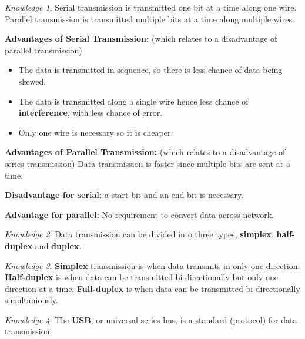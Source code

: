 \documentclass[8pt]{article}
\theoremstyle{remark}
\newtheorem{knowledge}{Knowledge}[subsection]
\begin{document}
        \begin{knowledge}
            Serial transmission is transmitted one bit at a time along one wire. Parallel transmission is transmitted multiple bits at a time along multiple wires.

            \textbf{Advantages of Serial Transmission:} (which relates to a disadvantage of parallel transmission)
            \begin{itemize}
                \item The data is transmitted in sequence, so there is less chance of data being skewed.
                \item The data is transmitted along a single wire hence less chance of \textbf{interference}, with less chance of error.
                \item Only one wire is necessary so it is cheaper.
            \end{itemize}

            \textbf{Advantages of Parallel Transmission:} (which relates to a disadvantage of series transmission) Data transmission is faster since multiple bits are sent at a time.

            \textbf{Disadvantage for serial:} a start bit and an end bit is necessary.

            \textbf{Advantage for parallel:} No requirement to convert data across network.
        \end{knowledge}

        \begin{knowledge}
            Data transmission can be divided into three types, \textbf{simplex}, \textbf{half-duplex} and \textbf{duplex}.
        \end{knowledge}

        \begin{knowledge}
            \textbf{Simplex} transmission is when data transmits in only one direction. \textbf{Half-duplex} is when data can be transmitted bi-directionally but only one direction at a time. \textbf{Full-duplex} is when data can be transmitted bi-directionally simultaniously.
        \end{knowledge}

        \begin{knowledge}
            The \textbf{USB}, or universal series bus, is a standard (protocol) for data transmission.
        \end{knowledge}
\end{document}
